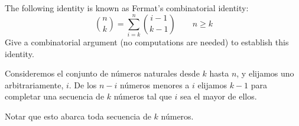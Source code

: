 \item The following identity is known as Fermat’s combinatorial identity:
\[ \binom{n}{k} = \sum_{i=k}^n \binom{i-1}{k-1} \qquad n \ge k \]
Give a combinatorial argument (no computations are needed) to establish this identity.

Consideremos el conjunto de números naturales desde $k$ hasta $n$, y elijamos uno arbitrariamente, $i$. De los $n-i$ números menores a $i$ elijamos $k-1$ para completar una secuencia de $k$ números tal que $i$ sea el mayor de ellos. 

Notar que esto abarca toda secuencia de $k$ números.

